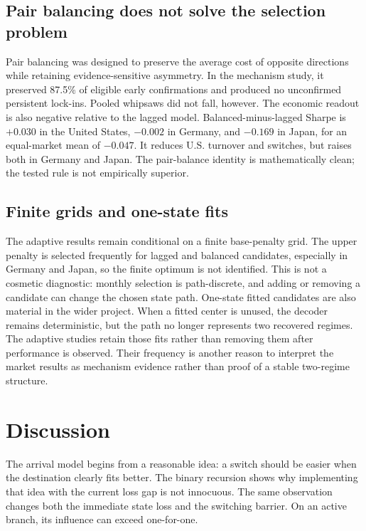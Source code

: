 \subsection{Pair balancing does not solve the selection problem}

Pair balancing was designed to preserve the average cost of opposite directions
while retaining evidence-sensitive asymmetry. In the mechanism study, it
preserved 87.5\% of eligible early confirmations and produced no unconfirmed
persistent lock-ins. Pooled whipsaws did not fall, however. The economic readout
is also negative relative to the lagged model. Balanced-minus-lagged Sharpe is
$+0.030$ in the United States, $-0.002$ in Germany, and $-0.169$ in Japan, for an
equal-market mean of $-0.047$. It reduces U.S. turnover and switches, but raises
both in Germany and Japan. The pair-balance identity is mathematically clean; the
tested rule is not empirically superior.

\subsection{Finite grids and one-state fits}

The adaptive results remain conditional on a finite base-penalty grid. The upper
penalty is selected frequently for lagged and balanced candidates, especially in
Germany and Japan, so the finite optimum is not identified. This is not a cosmetic
diagnostic: monthly selection is path-discrete, and adding or removing a candidate
can change the chosen state path. One-state fitted candidates are also material in
the wider project. When a fitted center is unused, the decoder remains
deterministic, but the path no longer represents two recovered regimes. The
adaptive studies retain those fits rather than removing them after performance is
observed. Their frequency is another reason to interpret the market results as
mechanism evidence rather than proof of a stable two-regime structure.

\section{Discussion}

The arrival model begins from a reasonable idea: a switch should be easier when
the destination clearly fits better. The binary recursion shows why implementing
that idea with the current loss gap is not innocuous. The same observation
changes both the immediate state loss and the switching barrier. On an active
branch, its influence can exceed one-for-one.

